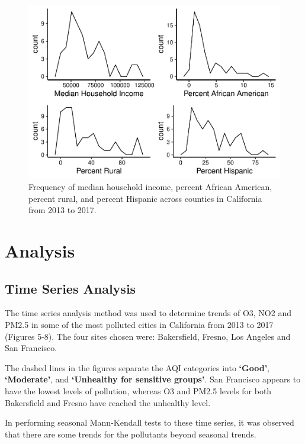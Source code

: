 \documentclass[12pt,]{article}
\begin{document}
\begin{figure}
\centering
\includegraphics{FinalProject_AliciaZhao_files/figure-latex/unnamed-chunk-14-1.pdf}
\caption{Frequency of median household income, percent African American,
percent rural, and percent Hispanic across counties in California from
2013 to 2017.}
\end{figure}

\newpage

\hypertarget{analysis}{%
\section{Analysis}\label{analysis}}

\hypertarget{time-series-analysis}{%
\subsection{Time Series Analysis}\label{time-series-analysis}}

The time series analysis method was used to determine trends of O3, NO2
and PM2.5 in some of the most polluted cities in California from 2013 to
2017 (Figures 5-8). The four sites chosen were: Bakersfield, Fresno, Los
Angeles and San Francisco.

The dashed lines in the figures separate the AQI categories into
\textbf{`Good'}, \textbf{`Moderate'}, and \textbf{`Unhealthy for
sensitive groups'}. San Francisco appears to have the lowest levels of
pollution, whereas O3 and PM2.5 levels for both Bakersfield and Fresno
have reached the unhealthy level.

In performing seasonal Mann-Kendall tests to these time series, it was
observed that there are some trends for the pollutants beyond seasonal
trends.
\end{document}

